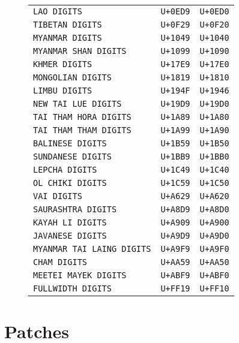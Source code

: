 \begin{figure}[hb!]
\begin{center}
\begin{tabular}{lrr}
\texttt{LAO DIGITS} & \texttt{U+0ED9} &  \texttt{U+0ED0}\\
\texttt{TIBETAN DIGITS} & \texttt{U+0F29} &  \texttt{U+0F20}\\
\texttt{MYANMAR DIGITS} & \texttt{U+1049} &  \texttt{U+1040}\\
\texttt{MYANMAR SHAN DIGITS} & \texttt{U+1099} &  \texttt{U+1090}\\
\texttt{KHMER DIGITS} & \texttt{U+17E9} &  \texttt{U+17E0}\\
\texttt{MONGOLIAN DIGITS} & \texttt{U+1819} &  \texttt{U+1810}\\
\texttt{LIMBU DIGITS} & \texttt{U+194F} &  \texttt{U+1946}\\
\texttt{NEW TAI LUE DIGITS} & \texttt{U+19D9} &  \texttt{U+19D0}\\
\texttt{TAI THAM HORA DIGITS} & \texttt{U+1A89} &  \texttt{U+1A80}\\
\texttt{TAI THAM THAM DIGITS} & \texttt{U+1A99} &  \texttt{U+1A90}\\
\texttt{BALINESE DIGITS} & \texttt{U+1B59} &  \texttt{U+1B50}\\
\texttt{SUNDANESE DIGITS} & \texttt{U+1BB9} &  \texttt{U+1BB0}\\
\texttt{LEPCHA DIGITS} & \texttt{U+1C49} &  \texttt{U+1C40}\\
\texttt{OL CHIKI DIGITS} & \texttt{U+1C59} &  \texttt{U+1C50}\\
\texttt{VAI DIGITS} & \texttt{U+A629} &  \texttt{U+A620}\\
\texttt{SAURASHTRA DIGITS} & \texttt{U+A8D9} &  \texttt{U+A8D0}\\
\texttt{KAYAH LI DIGITS} & \texttt{U+A909} &  \texttt{U+A900}\\
\texttt{JAVANESE DIGITS} & \texttt{U+A9D9} &  \texttt{U+A9D0}\\
\texttt{MYANMAR TAI LAING DIGITS} & \texttt{U+A9F9} &  \texttt{U+A9F0}\\
\texttt{CHAM DIGITS} & \texttt{U+AA59} &  \texttt{U+AA50}\\
\texttt{MEETEI MAYEK DIGITS} & \texttt{U+ABF9} &  \texttt{U+ABF0}\\
\texttt{FULLWIDTH DIGITS} & \texttt{U+FF19} &  \texttt{U+FF10}\\
            \bottomrule
        \end{tabular}
        \endgroup
    \end{center}
\end{figure}

\chapter{Patches}
\label{appx:patches}

